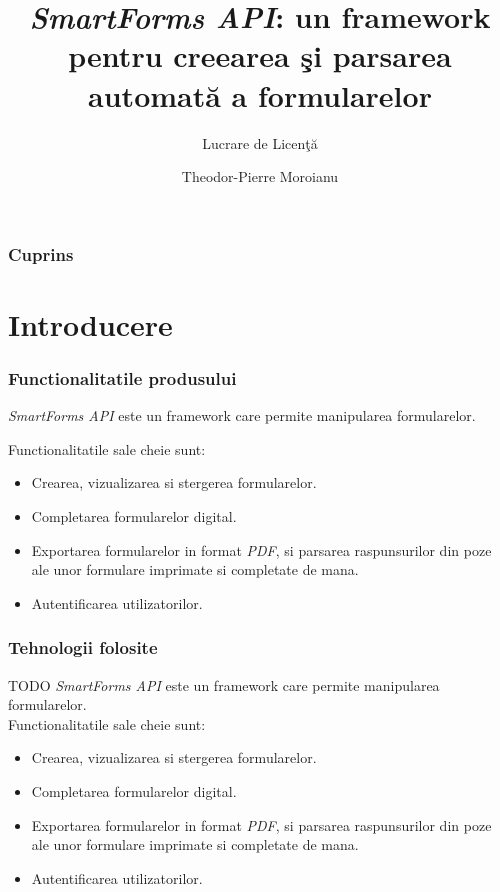 \documentclass[9pt]{beamer}
\title[SmartForms API] %
{\emph{SmartForms API}: un framework pentru creearea \c si parsarea automat\u a a formularelor}
\subtitle{Lucrare de Licen\c t\u a}
\author %
{Theodor-Pierre Moroianu}
\institute[Unibuc] %
{
	Facultatea de Matematic\u a-Informatic\u a\\
	Universitatea din Bucure\c sti
}
\begin{document}
\frame{\titlepage}


\begin{frame}
	\frametitle{Cuprins}
	\tableofcontents
\end{frame}

\section{Introducere}

\begin{frame}
	\frametitle{Functionalitatile produsului}
	
	\emph{SmartForms API} este un framework care permite manipularea formularelor.\\
	\vspace{10pt}
		
	Functionalitatile sale cheie sunt:
	
	\begin{itemize}
		\item Crearea, vizualizarea si stergerea formularelor.%
		\item Completarea formularelor digital.%
		\item Exportarea formularelor in format \emph{PDF}, si parsarea raspunsurilor din poze ale unor formulare imprimate si completate de mana.%
		\item Autentificarea utilizatorilor.
	\end{itemize}
\end{frame}

\begin{frame}
	\frametitle{Tehnologii folosite}
	TODO
	\emph{SmartForms API} este un framework care permite manipularea formularelor.\\
	Functionalitatile sale cheie sunt:
	
	\begin{itemize}
		\item Crearea, vizualizarea si stergerea formularelor.%
		\item Completarea formularelor digital.%
		\item Exportarea formularelor in format \emph{PDF}, si parsarea raspunsurilor din poze ale unor formulare imprimate si completate de mana.%
		\item Autentificarea utilizatorilor.
	\end{itemize}
\end{frame}
\end{document}
